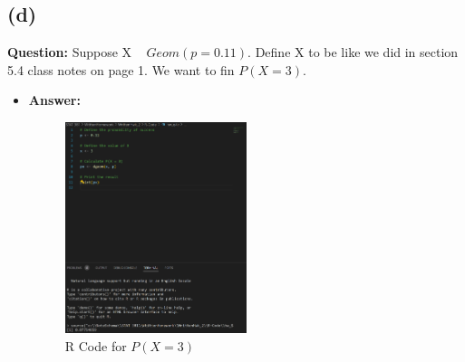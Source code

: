 \documentclass{article}
\begin{document}
\subsection*{(d)} \textbf{Question:} Suppose X ~ $Geom(p = 0.11)$. Define X to be like we did in section 5.4 class notes on page 1. We want to fin $P(X = 3)$.
\begin{itemize}
    \item[] \textbf{Answer:} 
    \begin{figure}[h]
        \centering
        \includegraphics[width=0.5\textwidth]{RHW2.6.d.png}
        \caption{R Code for $P(X = 3)$}
        \label{fig:RHW2.6.d}
    \end{figure}
\end{itemize}
\end{document}
